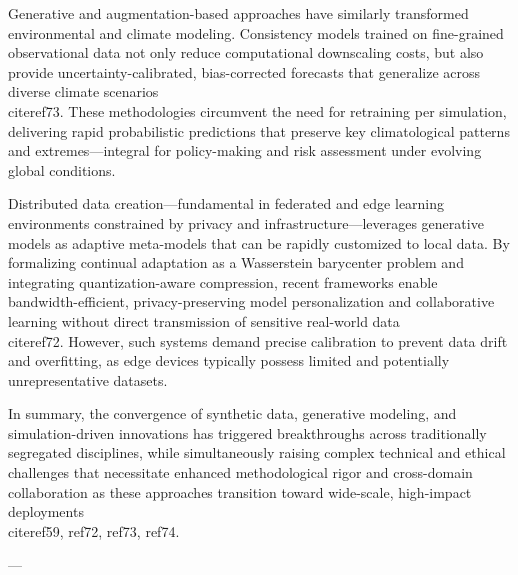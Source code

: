 \documentclass[11pt]{article}
\begin{document}
Generative and augmentation-based approaches have similarly transformed environmental and climate modeling. Consistency models trained on fine-grained observational data not only reduce computational downscaling costs, but also provide uncertainty-calibrated, bias-corrected forecasts that generalize across diverse climate scenarios~\\cite{ref73}. These methodologies circumvent the need for retraining per simulation, delivering rapid probabilistic predictions that preserve key climatological patterns and extremes—integral for policy-making and risk assessment under evolving global conditions.

Distributed data creation—fundamental in federated and edge learning environments constrained by privacy and infrastructure—leverages generative models as adaptive meta-models that can be rapidly customized to local data. By formalizing continual adaptation as a Wasserstein barycenter problem and integrating quantization-aware compression, recent frameworks enable bandwidth-efficient, privacy-preserving model personalization and collaborative learning without direct transmission of sensitive real-world data~\\cite{ref72}. However, such systems demand precise calibration to prevent data drift and overfitting, as edge devices typically possess limited and potentially unrepresentative datasets.

In summary, the convergence of synthetic data, generative modeling, and simulation-driven innovations has triggered breakthroughs across traditionally segregated disciplines, while simultaneously raising complex technical and ethical challenges that necessitate enhanced methodological rigor and cross-domain collaboration as these approaches transition toward wide-scale, high-impact deployments~\\cite{ref59, ref72, ref73, ref74}.

---
\end{document}
